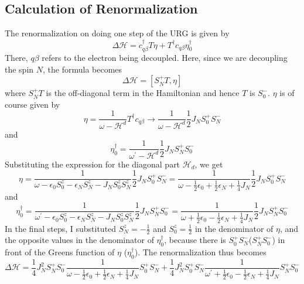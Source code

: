 \documentclass[twoside,11pt]{report}
\numberwithin{equation}{section}
\begin{document}
\subsection{Calculation of Renormalization}
The renormalization on doing one step of the URG is given by
\begin{equation}
	\Delta \mathcal{H} = c_{q\beta}^\dagger T \eta + T^\dagger c_{q\beta} \eta_0^\dagger
\end{equation}
There, \(q\beta\) refers to the electron being decoupled. Here, since we are decoupling the spin \(N\), the formula becomes
\begin{equation}
	\Delta \mathcal{H} = \left[S_N^+T,\eta\right]
\end{equation}
where \(S_N^+T\) is the  off-diagonal term in the Hamiltonian and hence \(T\) is  \(S_0^-\). \(\eta\) is of course given by
\begin{equation}
	\eta = \frac{1}{\omega - \mathcal{H}^d}T^\dagger c_{q\beta} \to \frac{1}{\omega - \mathcal{H}^d}\frac{1}{2}J_N S_0^+ S_N^-
\end{equation}
and
\begin{equation}
	\eta_0^\dagger = \frac{1}{\omega^\prime - \mathcal{H}^d}\frac{1}{2}J_N S_N^+ S_0^-
\end{equation}
Substituting the expression for the diagonal part \(\mathcal{H}_d\), we get
\begin{equation}
	\label{stareta}
	\eta  = \frac{1}{\omega - \epsilon_0 S^z_0 - \epsilon_N S^z_N - J_NS^z_0 S^z_N}\frac{1}{2}J_NS_0^+ S_N^- = \frac{1}{\omega - \frac{1}{2}\epsilon_0 + \frac{1}{2}\epsilon_N + \frac{1}{4}J_N}\frac{1}{2}J_NS_0^+ S_N^-
\end{equation}
and
\begin{equation}
	\eta_0^\dagger = \frac{1}{\omega^\prime - \epsilon_0 S^z_0 - \epsilon_N S^z_N - J_NS^z_0 S^z_N}\frac{1}{2}J_NS_N^+ S_0^- = \frac{1}{\omega + \frac{1}{2}\epsilon_0 - \frac{1}{2}\epsilon_N + \frac{1}{4}J_N}\frac{1}{2}J_NS_N^+ S_0^-
\end{equation}
In the final steps, I substituted \(S_N^z = -\frac{1}{2}\) and \(S_0^z = \frac{1}{2}\) in the denominator of \(\eta\), and the opposite values in the denominator of \(\eta_0^\dagger\), because there is \(S_0^+ S_N^-\)(\(S_N^+ S_0^-\)) in front of the Greens function of \(\eta\) (\(\eta_0^\dagger\)). The renormalization thus becomes
\begin{equation}
	\Delta \mathcal{H} = \frac{1}{4}J_N^2 S_N^+S_0^- \frac{1}{\omega - \frac{1}{2}\epsilon_0 + \frac{1}{2}\epsilon_N + \frac{1}{4}J_N}S_0^+ S_N^- + \frac{1}{4}J_N^2S_0^+ S_N^- \frac{1}{\omega^\prime + \frac{1}{2}\epsilon_0 - \frac{1}{2}\epsilon_N + \frac{1}{4}J_N} S_N^+S_0^-
\end{equation}
\end{document}

